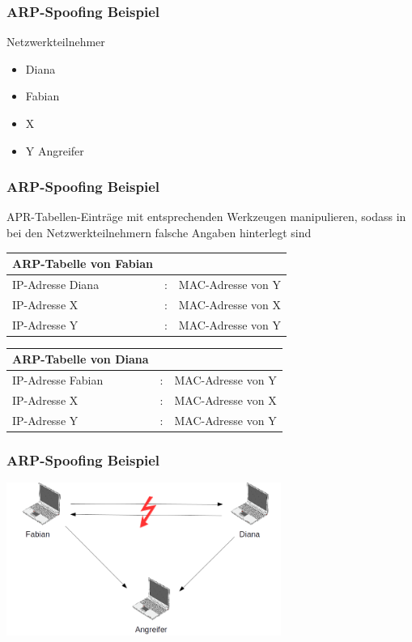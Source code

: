 \documentclass{beamer}
\begin{document}
    	\begin{frame}
	   		\frametitle{ARP-Spoofing Beispiel}
	   		Netzwerkteilnehmer
	   		\begin{itemize}
	   		\item Diana
	   		\item Fabian
	   		\item X
	   		\item Y Angreifer
	   		\end{itemize}           	
	   	\end{frame}
	   	
	   	\begin{frame}
	   		\frametitle{ARP-Spoofing Beispiel}
	   		APR-Tabellen-Einträge mit entsprechenden Werkzeugen manipulieren, sodass in bei den Netzwerkteilnehmern falsche Angaben hinterlegt sind
	   			\vfill
			   	\begin{tabular}{l c l}
			   		ARP-Tabelle von Fabian & & \\
			   		\hline
			   		IP-Adresse Diana & : & MAC-Adresse von Y \\
			   		IP-Adresse X & : & MAC-Adresse von X \\
			   		IP-Adresse Y & : & MAC-Adresse von Y \\
			   	\end{tabular}
			   	\vfill
			   	\begin{tabular}{l c l}
			   		ARP-Tabelle von Diana & & \\
			   		\hline
			   		IP-Adresse Fabian & : & MAC-Adresse von Y \\
			   		IP-Adresse X & : & MAC-Adresse von X \\
			   		IP-Adresse Y & : & MAC-Adresse von Y \\
			   	\end{tabular}         	
	   	\end{frame}
	   	
	   	\begin{frame}
	   		\frametitle{ARP-Spoofing Beispiel}
	   		\includegraphics[height=5.0cm]{ARP-Tabelle-manipuliert.png}
	   	\end{frame}
	   	
\end{document}
